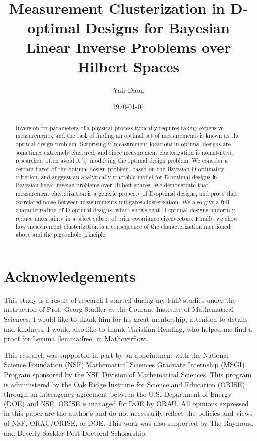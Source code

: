 \documentclass{amsart}
\title[Measurement Clusterization in D-optimal Designs]{Measurement
  Clusterization in D-optimal Designs for Bayesian Linear Inverse
  Problems over Hilbert Spaces}
\author{Yair Daon}
\date{\today}
\begin{document}
\begin{abstract}
  Inversion for parameters of a physical process typically requires
  taking expensive measurements, and the task of finding an optimal
  set of measurements is known as the optimal design
  problem. Surprisingly, measurement locations in optimal designs are
  sometimes extremely clustered, and since measurement clusterization
  is nonintuitive, researchers often avoid it by modifying the optimal
  design problem. We consider a certain flavor of the optimal design
  problem, based on the Bayesian D-optimality criterion, and suggest
  an analytically tractable model for D-optimal designs in Bayesian
  linear inverse problems over Hilbert spaces. We demonstrate that
  measurement clusterization is a generic property of D-optimal
  designs, and prove that correlated noise between measurements
  mitigates clusterization. We also give a full characterization of
  D-optimal designs, which shows that D-optimal designs uniformly
  reduce uncertainty in a select subset of prior covariance
  eigenvectors. Finally, we show how measurement clusterization is a
  consequence of the characterization mentioned above and the
  pigeonhole principle.
\end{abstract}
\maketitle










\section{Acknowledgements}
This study is a result of research I started during my PhD studies
under the instruction of Prof. Georg Stadler at the Courant Institute
of Mathematical Sciences. I would like to thank him for his great
mentorship, attention to details and kindness. I would also like to
thank Christian Remling, who helped me find a proof for Lemma
\ref{lemma:free} in
\href{https://mathoverflow.net/questions/280168/redistribute-diagonal-entries-of-a-matrix/280203#280203c}{Mathoverflow}.

This research was supported in part by an appointment with the
National Science Foundation (NSF) Mathematical Sciences Graduate
Internship (MSGI) Program sponsored by the NSF Division of
Mathematical Sciences. This program is administered by the Oak Ridge
Institute for Science and Education (ORISE) through an interagency
agreement between the U.S. Department of Energy (DOE) and NSF. ORISE
is managed for DOE by ORAU. All opinions expressed in this paper are
the author's and do not necessarily reflect the policies and views of
NSF, ORAU/ORISE, or DOE. This work was also supported by The Raymond
and Beverly Sackler Post-Doctoral Scholarship.



%


\end{document}
